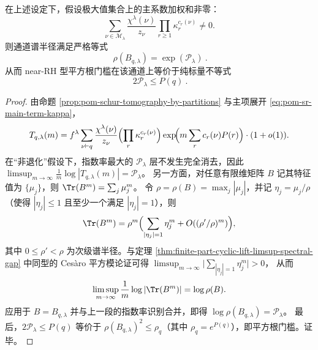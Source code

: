 \begin{theorem}\label{thm:pom-schur-channel-radius-character-sieve}
在上述设定下，假设极大值集合上的主系数加权和非零：
\[
\sum_{\nu\in\mathcal{M}_\lambda}\frac{\chi^\lambda(\nu)}{z_\nu}\prod_{r\ge 1}\kappa_r^{c_r(\nu)}\neq 0.
\]
则通道谱半径满足严格等式
\[
\boxed{\ \rho(B_{q,\lambda})=\exp(\mathcal{P}_\lambda)\ }.
\]
从而 near-RH 型平方根门槛在该通道上等价于纯标量不等式
\[
\boxed{\ 2\mathcal{P}_\lambda\le P(q)\ }.
\]
\end{theorem}
\begin{proof}
由命题 \ref{prop:pom-schur-tomography-by-partitions} 与主项展开 \eqref{eq:pom-sr-main-term-kappa}，
\[
T_{q,\lambda}(m)
=
f^\lambda\sum_{\nu\vdash q}\frac{\chi^\lambda(\nu)}{z_\nu}
\Bigl(\prod_r \kappa_r^{c_r(\nu)}\Bigr)
\exp\!\Bigl(m\sum_r c_r(\nu)P(r)\Bigr)\cdot(1+o(1)).
\]
在“非退化”假设下，指数率最大的 \(\mathcal{P}_\lambda\) 层不发生完全消去，因此
\(
\limsup_{m\to\infty}\frac{1}{m}\log|T_{q,\lambda}(m)|=\mathcal{P}_\lambda
\)。
另一方面，对任意有限维矩阵 \(B\) 记其特征值为 \(\{\mu_j\}\)，则
\(
\Tr(B^m)=\sum_j \mu_j^m
\)。
令 \(\rho=\rho(B)=\max_j|\mu_j|\)，并记 \(\eta_j=\mu_j/\rho\)（使得 \(|\eta_j|\le 1\) 且至少一个满足 \(|\eta_j|=1\)），则
\[
\Tr(B^m)=\rho^m\Bigl(\sum_{|\eta_j|=1}\eta_j^m+O((\rho'/\rho)^m)\Bigr),
\]
其中 \(0\le \rho'<\rho\) 为次级谱半径。与定理 \ref{thm:finite-part-cyclic-lift-limsup-spectral-gap} 中同型的 Ces\`aro 平方模论证可得
\(\limsup_{m\to\infty}\bigl|\sum_{|\eta_j|=1}\eta_j^m\bigr|>0\)，
从而
\[
\limsup_{m\to\infty}\frac{1}{m}\log|\Tr(B^m)|=\log\rho(B).
\]
应用于 \(B=B_{q,\lambda}\) 并与上一段的指数率识别合并，即得 \(\log\rho(B_{q,\lambda})=\mathcal{P}_\lambda\)。
最后，\(2\mathcal{P}_\lambda\le P(q)\) 等价于 \(\rho(B_{q,\lambda})^2\le \rho_q\)（其中 \(\rho_q=e^{P(q)}\)），即平方根门槛。证毕。
\end{proof}



